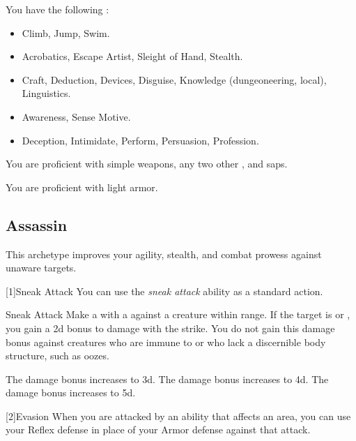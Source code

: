         You have the following :
        \begin{itemize}
            \item {} Climb, Jump, Swim.
            \item {} Acrobatics, Escape Artist, Sleight of Hand, Stealth.
            \item {} Craft, Deduction, Devices, Disguise, Knowledge (dungeoneering, local), Linguistics.
            \item {} Awareness, Sense Motive.
            \item {} Deception, Intimidate, Perform, Persuasion, Profession.
        \end{itemize}

        You are proficient with simple weapons, any two other , and saps.

        You are proficient with light armor.

    \subsection{Assassin}
        This archetype improves your agility, stealth, and combat prowess against unaware targets.

        [1]{Sneak Attack} You can use the \textit{sneak attack} ability as a standard action.
        \begin{freeability}{Sneak Attack}
            Make a  with a  against a creature within \rngclose range.
            If the target is \unaware or , you gain a \plus2d bonus to damage with the strike.
            You do not gain this damage bonus against creatures who are immune to  or who lack a discernible body structure, such as oozes.

            \rankline
             The damage bonus increases to \plus3d.
             The damage bonus increases to \plus4d.
             The damage bonus increases to \plus5d.
        \end{freeability}

        [2]{Evasion} When you are attacked by an ability that affects an area, you can use your Reflex defense in place of your Armor defense against that attack.

